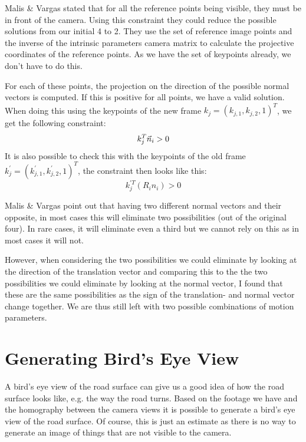 Malis \& Vargas \cite{homography-decomposition} stated that for all the reference points being visible, they must be in front of the camera. Using this constraint they could reduce the possible solutions from our initial 4 to 2. They use the set of reference image points and the inverse of the intrinsic parameters camera matrix to calculate the projective coordinates of the reference points. As we have the set of keypoints already, we don't have to do this.\bigskip

For each of these points, the projection on the direction of the possible normal vectors is computed. If this is positive for all points, we have a valid solution. When doing this using the keypoints of the new frame $k_j = (k_{j, 1}, k_{j, 2}, 1)^T$, we get the following constraint:
\begin{equation}
    k_j^T\vec n_i > 0
\end{equation}
It is also possible to check this with the keypoints of the old frame $k^{'}_j = (k^{'}_{j, 1}, k^{'}_{j, 2}, 1)^T$, the constraint then looks like this:
\begin{equation}
    k^{'T}_j (R_{i}n_i) > 0
\end{equation}

Malis \& Vargas point out that having two different normal vectors and their opposite, in most cases this will  eliminate two possibilities (out of the original four). In rare cases, it will eliminate even a third but we cannot rely on this as in most cases it will not. \bigskip

However, when considering the two possibilities we could eliminate by looking at the direction of the translation vector and comparing this to the the two possibilities we could eliminate by looking at the normal vector, I found that these are the same possibilities as the sign of the translation- and normal vector change together. We are thus still left with two possible combinations of motion parameters. 

\section{Generating Bird's Eye View}
A bird's eye view of the road surface can give us a good idea of how the road surface looks like, e.g. the way the road turns. Based on the footage we have and the homography between the camera views it is possible to generate a bird's eye view of the road surface. Of course, this is just an estimate as there is no way to generate an image of things that are not visible to the camera.\bigskip

